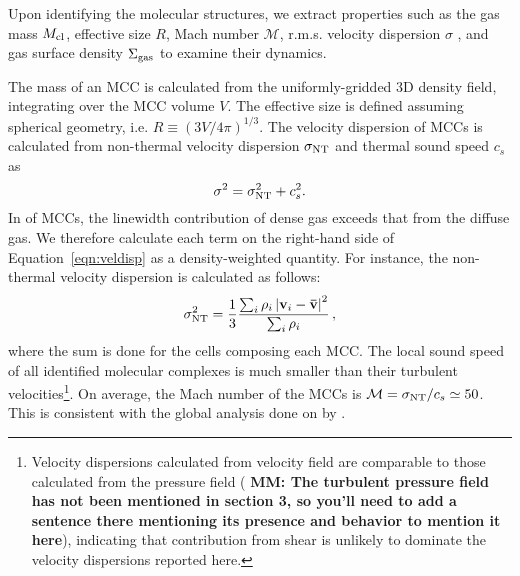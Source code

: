 \IfFileExists{emulateapjlegacy.cls}{\documentclass[iop]{emulateapjlegacy}}{\documentclass[iop]{emulateapj}}
\newcommand{\MM}[1]{({\bf \color{mmcolor} MM: #1})}
\begin{document}
Upon identifying the molecular structures, we extract properties such
as the gas mass $M_{\rm cl}$, effective size $R$, Mach number
$\mathcal{M}$, r.m.s. velocity dispersion $\sigma$
, and gas surface density $\Sigma_{\rm gas}$ to examine their dynamics.

The mass of an MCC is calculated from the uniformly-gridded 3D density field, integrating over the MCC volume $V$. The effective size is defined assuming spherical geometry, i.e. $R \equiv (3 V /4 \pi)^{1/3}$.
%
The velocity dispersion of MCCs is calculated from non-thermal
velocity dispersion $\sigma_{\rm NT}$ and thermal sound speed $c_s$ as
\begin{equation}
\sigma^2 = \sigma_{\rm NT}^2 + c_s^2.
\label{eqn:veldisp}
\end{equation}
%
In \obs of MCCs, the linewidth contribution of dense gas 
exceeds that from the diffuse gas. We therefore calculate each term on
the right-hand side of Equation~\ref{eqn:veldisp} as a density-weighted quantity. For instance, the non-thermal velocity dispersion is calculated as follows:
\begin{equation}
\sigma_{\rm NT}^2 = \frac{1}{{3}}\frac{\sum_{i} \rho_i \left|\mathbf{v}_i - \mathbf{\bar v}\right|^2}{\sum_i \rho_i}\,,
\end{equation}
where the sum is done for the cells composing each MCC.
%
The local sound speed of all identified molecular complexes is much
smaller than their turbulent velocities\footnote{Velocity dispersions
  calculated from velocity field are comparable to those calculated
  from the pressure field 
    \MM{The turbulent pressure field has not been
    mentioned in section 3, so you'll need to add a sentence there
    mentioning its presence and behavior to mention it here}, 
indicating that contribution from shear is unlikely to dominate the velocity dispersions reported here.\label{ftn:veldisp}}. On average, the Mach number of the MCCs is  $\mathcal{M} = \sigma_{\rm NT}/c_s\simeq 50$. This is consistent with the global analysis done on \flower by \citet{Vallini18a}.
\end{document}
